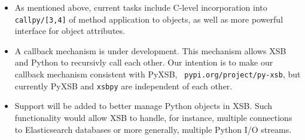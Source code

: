 \begin{itemize}
\item As mentioned above, current tasks include C-level incorporation
  into {\tt callpy/[3,4]} of method application to objects, as well as
  more powerful interface for object attributes.

\item A callback mechanism is under development.  This mechanism
  allows XSB and Python to recursivly call each other.  Our intention
  is to make our callback mechanism consistent with PyXSB, {\tt
    pypi.org/project/py-xsb}, but currently PyXSB and {\tt xsbpy} are
  independent of each other.

\item Support will be added to better manage Python objects in XSB.
  Such functionality would allow XSB to handle, for instance, multiple
  connections to Elasticsearch databases or more generally, multiple
  Python I/O streams.

\end{itemize}  
